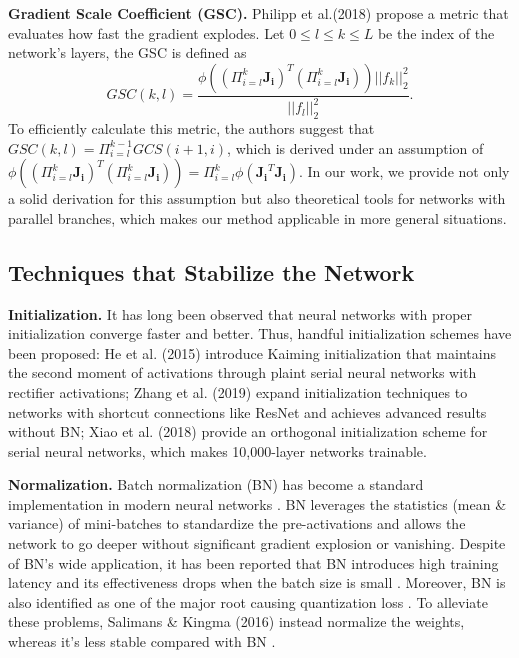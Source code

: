 \documentclass[10pt,journal,compsoc]{IEEEtran}
\begin{document}
\textbf{Gradient Scale Coefficient (GSC).} Philipp et al.(2018) \cite{philipp2018gradients} propose a metric that evaluates how fast the gradient explodes. Let $0\le l\le k \le L$ be the index of the network's layers, the GSC is defined as
\begin{equation}
    GSC(k, l) = \frac{\phi\left(\left(\Pi_{i=l}^k\mathbf{J_i}\right)^T\left(\Pi_{i=l}^k\mathbf{J_i}\right)\right)||f_k||_2^2}{||f_l||_2^2}.
\end{equation}
To efficiently calculate this metric, the authors suggest that $GSC(k,l) = \Pi_{i=l}^{k-1}GCS(i+1, i)$, which is derived under an assumption of $\phi\left(\left(\Pi_{i=l}^k\mathbf{J_i}\right)^T\left(\Pi_{i=l}^k\mathbf{J_i}\right)\right)=\Pi_{i=l}^k\phi(\mathbf{J_i}^T\mathbf{J_i})$. In our work, we provide not only a solid derivation for this assumption but also theoretical tools for networks with parallel branches, which makes our method applicable in more general situations.
\vspace{-10pt}
\subsection{Techniques that Stabilize the Network}

\hspace*{14pt}\textbf{Initialization.} It has long been observed that neural networks with proper initialization converge faster and better. Thus, handful initialization schemes have been proposed: He et al. (2015) \cite{he2015delving} introduce Kaiming initialization that maintains the second moment of activations through plaint serial neural networks with rectifier activations; Zhang et al. (2019) \cite{zhang2019fixup} expand initialization techniques to networks with shortcut connections like ResNet and achieves advanced results without BN; Xiao et al. (2018) \cite{xiao2018dynamical} provide an orthogonal initialization scheme for serial neural networks, which makes 10,000-layer networks trainable.

\textbf{Normalization.} Batch normalization (BN) \cite{ioffe2015batch} has become a standard implementation in modern neural networks \cite{he2016deep, huang2017densely}. BN leverages the statistics (mean \& variance) of mini-batches to standardize the pre-activations and allows the network to go deeper without significant gradient explosion or vanishing. Despite of BN's wide application, it has been reported that BN introduces high training latency \cite{chen2019effective,gitman2017comparison} and its effectiveness drops when the batch size is small \cite{wu2018group}. Moreover, BN is also identified as one of the major root causing quantization loss \cite{sheng2018quantization}. To alleviate these problems, Salimans \& Kingma (2016) \cite{salimans2016weight} instead normalize the weights, whereas it's less stable compared with BN \cite{gitman2017comparison}.
\end{document}
